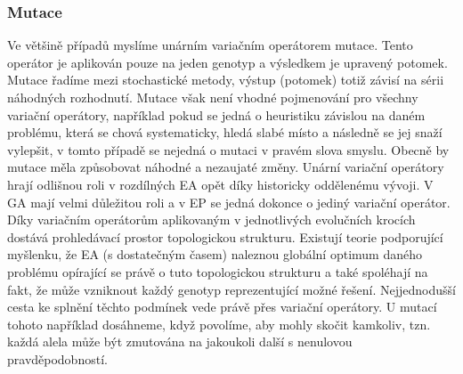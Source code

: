 \subsubsection{Mutace}
Ve většině případů myslíme unárním variačním operátorem mutace. Tento operátor je aplikován pouze na jeden genotyp a výsledkem je upravený potomek. Mutace řadíme mezi stochastické metody, výstup (potomek) totiž závisí na sérii náhodných rozhodnutí. Mutace však není vhodné pojmenování pro všechny variační operátory, například pokud se jedná o heuristiku závislou na daném problému, která se chová systematicky, hledá slabé místo a následně se jej snaží vylepšit, v tomto případě se nejedná o mutaci v pravém slova smyslu. Obecně by mutace měla způsobovat náhodné a nezaujaté změny. Unární variační operátory hrají odlišnou roli v rozdílných EA opět díky historicky oddělenému vývoji. V GA mají velmi důležitou roli a v EP se jedná dokonce o jediný variační operátor. Díky variačním operátorům aplikovaným v jednotlivých evolučních krocích dostává prohledávací prostor topologickou strukturu. Existují teorie podporující myšlenku, že EA (s dostatečným časem) naleznou globální optimum daného problému opírající se právě o tuto topologickou strukturu a také spoléhají na fakt, že může vzniknout každý genotyp reprezentující možné řešení. Nejjednodušší cesta ke splnění těchto podmínek vede právě přes variační operátory. U mutací tohoto například dosáhneme, když povolíme, aby mohly skočit kamkoliv, tzn. každá alela může být zmutována na jakoukoli další s nenulovou pravděpodobností.   
